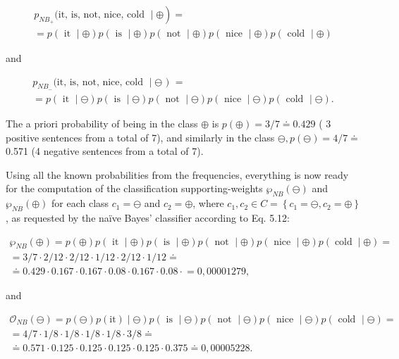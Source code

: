 \documentclass[10pt]{book}
\begin{document}
$$
\begin{gathered}
\left.p_{N B_{+}} \text {(it, is, not, nice, cold } \mid \oplus\right)= \\
=p(\text { it } \mid \oplus) p(\text { is } \mid \oplus) p(\text { not } \mid \oplus) p(\text { nice } \mid \oplus) p(\text { cold } \mid \oplus)
\end{gathered}
$$

and

$$
\begin{gathered}
p_{N B_{-}} \text {(it, is, not, nice, cold } \mid \ominus \text { ) }= \\
=p(\text { it } \mid \ominus) p(\text { is } \mid \ominus) p(\text { not } \mid \ominus) p(\text { nice } \mid \ominus) p(\text { cold } \mid \ominus) .
\end{gathered}
$$

The a priori probability of being in the class $\oplus$ is $p(\oplus)=3 / 7 \doteq 0.429$ ( 3 positive sentences from a total of 7), and similarly in the class $\ominus, p(\ominus)=4 / 7 \doteq$ 0.571 (4 negative sentences from a total of 7).

Using all the known probabilities from the frequencies, everything is now ready for the computation of the classification supporting-weights $\wp_{N B}(\ominus)$ and $\wp_{N B}(\oplus)$ for each class $c_{1}=\ominus$ and $c_{2}=\oplus$, where $c_{1}, c_{2} \in C=\left\{c_{1}=\ominus, c_{2}=\oplus\right\}$, as requested by the naïve Bayes' classifier according to Eq. 5.12:

$$
\begin{gathered}
\wp_{N B}(\oplus)=p(\oplus) p(\text { it } \mid \oplus) p(\text { is } \mid \oplus) p(\text { not } \mid \oplus) p(\text { nice } \mid \oplus) p(\operatorname{cold} \mid \oplus)= \\
=3 / 7 \cdot 2 / 12 \cdot 2 / 12 \cdot 1 / 12 \cdot 2 / 12 \cdot 1 / 12 \doteq \\
\doteq 0.429 \cdot 0.167 \cdot 0.167 \cdot 0.08 \cdot 0.167 \cdot 0.08 \cdot \stackrel{ }{=} 0,00001279,
\end{gathered}
$$

and

$$
\begin{gathered}
\left.\mathscr{O}_{N B}(\ominus)=p(\ominus) p(\mathrm{it}) \mid \ominus\right) p(\text { is } \mid \ominus) p(\text { not } \mid \ominus) p(\text { nice } \mid \ominus) p(\text { cold } \mid \ominus)= \\
=4 / 7 \cdot 1 / 8 \cdot 1 / 8 \cdot 1 / 8 \cdot 1 / 8 \cdot 3 / 8 \doteq \\
\doteq 0.571 \cdot 0.125 \cdot 0.125 \cdot 0.125 \cdot 0.125 \cdot 0.375 \doteq 0,00005228 .
\end{gathered}
$$
\end{document}
